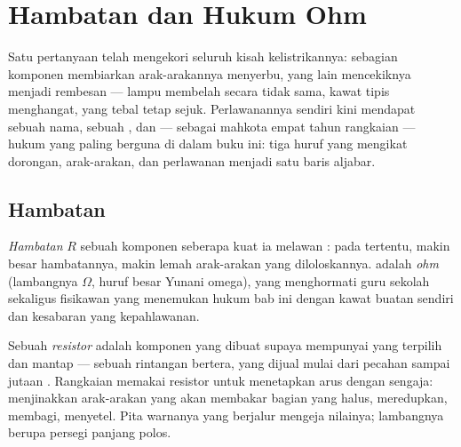 \chapter{Hambatan dan Hukum Ohm}\label{ch:g8:ohms-law}

Satu pertanyaan telah mengekori seluruh kisah kelistrikannya: sebagian
komponen membiarkan arak-arakannya menyerbu, yang lain mencekiknya
menjadi rembesan --- lampu membelah  secara tidak sama, kawat
tipis menghangat, yang tebal tetap sejuk. Perlawanannya sendiri kini
mendapat sebuah nama, sebuah , dan --- sebagai mahkota empat
tahun rangkaian --- hukum yang paling berguna di dalam buku ini: tiga
huruf yang mengikat dorongan, arak-arakan, dan perlawanan menjadi satu
baris aljabar.

\section{Hambatan}

\begin{definition}[Hambatan]\label{def:g8:ohms-law:resistance}
\emph{Hambatan} $R$ sebuah komponen  seberapa
kuat ia melawan : pada  tertentu, makin besar
hambatannya, makin lemah arak-arakan yang diloloskannya. 
adalah \emph{ohm} (lambangnya $\Omega$, huruf besar Yunani
omega), yang menghormati guru sekolah sekaligus fisikawan yang
menemukan hukum bab ini dengan kawat buatan sendiri dan kesabaran yang
kepahlawanan.
\end{definition}

\begin{definition}[Resistor]\label{def:g8:ohms-law:resistor}
Sebuah \emph{resistor} adalah komponen yang dibuat
supaya mempunyai  yang terpilih dan mantap --- sebuah rintangan
bertera, yang dijual mulai dari pecahan  sampai jutaan .
Rangkaian memakai resistor untuk menetapkan arus dengan sengaja:
menjinakkan arak-arakan yang akan membakar bagian yang halus,
meredupkan, membagi, menyetel. Pita warnanya yang berjalur mengeja
nilainya; lambangnya berupa persegi panjang polos.
\end{definition}

